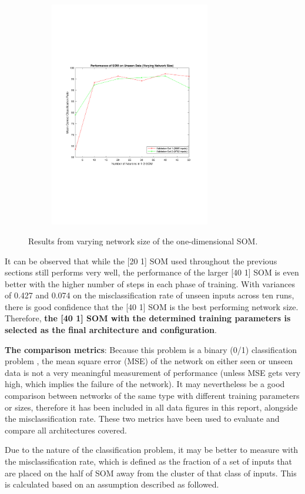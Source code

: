 \documentclass[10pt, oneside]{article}
\begin{document}
\begin{figure}[h]
\begin{subfigure}{0.5\textwidth}
\includegraphics[width=7cm, right]{final-testing-plot.pdf}
\end{subfigure}
\caption{\label{fig:size-testing} Results from varying network size of the one-dimensional SOM.}
\end{figure}

It can be observed that while the [20 1] SOM used throughout the previous sections still performs very well, the performance of the larger [40 1] SOM is even better with the higher number of steps in each phase of training. With variances of 0.427 and 0.074 on the misclassification rate of unseen inputs across ten runs, there is good confidence that the [40 1] SOM is the best performing network size. Therefore, \textbf{the [40 1] SOM with the determined training parameters is selected as the final architecture and configuration}.

\textbf{The comparison metrics}: Because this problem is a binary (0/1) classification problem \cite[p. 28]{candanedo2016accurate}, the mean square error (MSE) of the network on either seen or unseen data is not a very meaningful measurement of performance (unless MSE gets very high, which implies the failure of the network). It may nevertheless be a good comparison between networks of the same type with different training parameters or sizes, therefore it has been included in all data figures in this report, alongside the misclassification rate. These two metrics have been used to evaluate and compare all architectures covered.

Due to the nature of the classification problem, it may be better to measure with the misclassification rate, which is defined as the fraction of a set of inputs that are placed on the half of SOM away from the cluster of that class of inputs. This is calculated based on an assumption described as followed.
\end{document}
